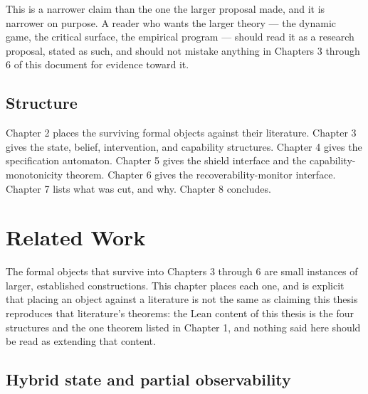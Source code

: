 \documentclass{memoir}
\begin{document}
This is a narrower claim than the one the larger proposal made, and it is
narrower on purpose. A reader who wants the larger theory — the dynamic
game, the critical surface, the empirical program — should read it as a
research proposal, stated as such, and should not mistake anything in
Chapters 3 through 6 of this document for evidence toward it.



\section{Structure}\label{Capability--Monotonicity--in--a--Formal--Skeleton--for--Agentic--AI--Safety----Introduction----Structure}

Chapter 2 places the surviving formal objects against their literature.
Chapter 3 gives the state, belief, intervention, and capability structures.
Chapter 4 gives the specification automaton. Chapter 5 gives the shield
interface and the capability-monotonicity theorem. Chapter 6 gives the
recoverability-monitor interface. Chapter 7 lists what was cut, and why.
Chapter 8 concludes.





\chapter{Related Work}\label{Capability--Monotonicity--in--a--Formal--Skeleton--for--Agentic--AI--Safety----Related--Work}

The formal objects that survive into Chapters 3 through 6 are small
instances of larger, established constructions. This chapter places each
one, and is explicit that placing an object against a literature is not the
same as claiming this thesis reproduces that literature's theorems: the
Lean content of this thesis is the four structures and the one theorem
listed in Chapter 1, and nothing said here should be read as extending that
content.



\section{Hybrid state and partial observability}\label{Capability--Monotonicity--in--a--Formal--Skeleton--for--Agentic--AI--Safety----Related--Work----Hybrid--state--and--partial--observability}
\end{document}
